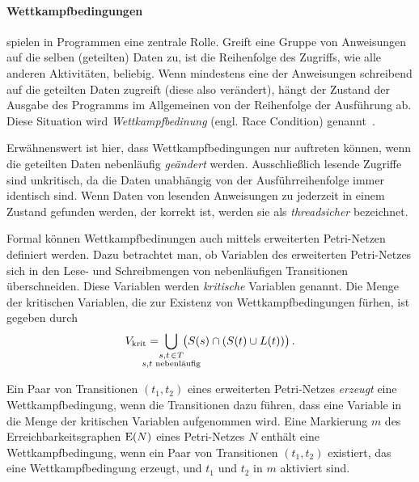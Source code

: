 \paragraph{Wettkampfbedingungen}
 spielen in Programmen eine zentrale Rolle. Greift eine Gruppe von Anweisungen auf die selben (geteilten) Daten zu, ist die Reihenfolge des Zugriffs, wie alle anderen Aktivitäten, beliebig. Wenn mindestens eine der Anweisungen schreibend auf die geteilten Daten zugreift (diese also verändert), hängt der Zustand der Ausgabe des Programms im Allgemeinen von der Reihenfolge der Ausführung ab. Diese Situation wird \emph{Wettkampfbedinung} (engl. Race Condition) genannt~\cite{Hettel2016}. 

Erwähnenswert ist hier, dass Wettkampfbedingungen nur auftreten können, wenn die geteilten Daten nebenläufig \emph{geändert} werden. Ausschließlich lesende Zugriffe sind unkritisch, da die Daten unabhängig von der Ausführreihenfolge immer identisch sind. Wenn Daten von lesenden Anweisungen zu jederzeit in einem Zustand gefunden werden, der korrekt ist, werden sie als \emph{threadsicher} bezeichnet.

Formal können Wettkampfbedinungen auch mittels erweiterten Petri-Netzen definiert werden. Dazu betrachtet man, ob Variablen des erweiterten Petri-Netzes sich in den Lese- und Schreibmengen von nebenläufigen Transitionen überschneiden. Diese Variablen werden \emph{kritische} Variablen genannt. Die Menge der kritischen Variablen, die zur Existenz von Wettkampfbedingungen fürhen, ist gegeben durch
\begin{align*}
	V_\text{krit} = \;\bigcup_{\mathclap{\substack{s,t\, \in T\\s, t \text{ nebenläufig}}}} \;\left( \strut{S(s) \cap (S(t) \cup L(t))}\right).
\end{align*}

Ein Paar von Transitionen $(t_1, t_2)$ eines erweiterten Petri-Netzes \emph{erzeugt} eine Wettkampfbedingung, wenn die Transitionen dazu führen, dass eine Variable in die Menge der kritischen Variablen aufgenommen wird. Eine Markierung $m$ des Erreichbarkeitsgraphen $\operatorname{E}(N)$ eines Petri-Netzes $N$ enthält eine Wettkampfbedingung, wenn ein Paar von Transitionen $(t_1, t_2)$ existiert, das eine Wettkampfbedingung erzeugt, und $t_1$ und $t_2$ in $m$ aktiviert sind.

